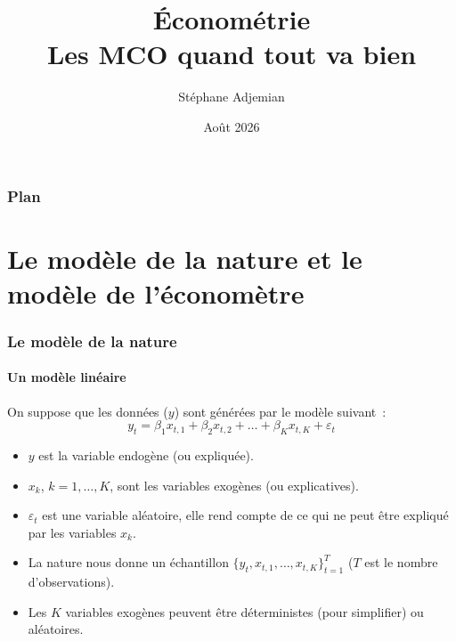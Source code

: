 \documentclass[10pt]{beamer}
\begin{document}
\title{Économétrie\\\small{Les MCO quand tout va bien}}
\author[S. Adjemian]{Stéphane Adjemian}
\date{Août 2026}

\begin{frame}
  \titlepage{}
\end{frame}

\begin{frame}
  \frametitle{Plan}
  \tableofcontents
\end{frame}

\section{Le modèle de la nature et le modèle de l'économètre}

\begin{frame}
  \frametitle{Le modèle de la nature}
  \framesubtitle{Un modèle linéaire}

  \bigskip

  On suppose que les données ($y$) sont générées par le modèle suivant~:
  \[
    y_t = \beta_1x_{t,1} + \beta_2x_{t,2} + \dots + \beta_Kx_{t,K} + \varepsilon_t
  \]

  \bigskip

  \begin{itemize}

  \item $y$ est la variable endogène (ou expliquée).\newline

  \item $x_{k}$, $k=1,\ldots,K$, sont les variables exogènes (ou explicatives).\newline

  \item $\varepsilon_t$ est une variable aléatoire, elle rend compte de ce qui ne peut être expliqué par les variables $x_k$.\newline

  \item La nature nous donne un échantillon $\{y_t,x_{t,1},\ldots,x_{t,K}\}_{t=1}^T$ ($T$ est le nombre d'observations).\newline

  \item Les $K$ variables exogènes peuvent être déterministes (pour simplifier) ou aléatoires.\newline

  \end{itemize}

\end{frame}
\end{document}
